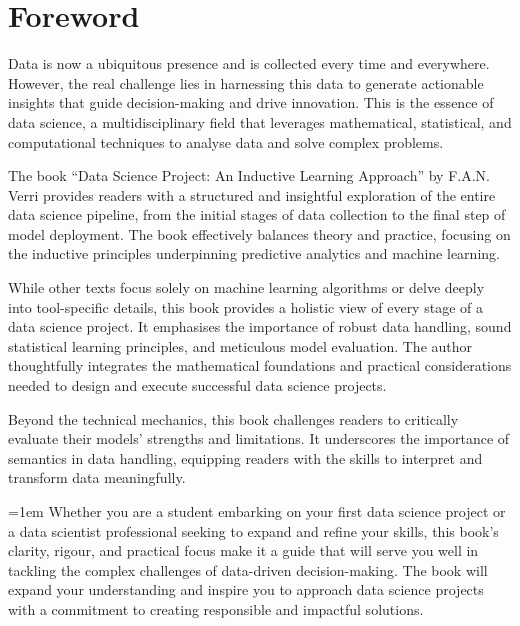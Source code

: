 \chapter{Foreword}


Data is now a ubiquitous presence and is collected every time and everywhere. However, the
real challenge lies in harnessing this data to generate actionable insights that guide
decision-making and drive innovation. This is the essence of data science, a
multidisciplinary field that leverages mathematical, statistical, and computational
techniques to analyse data and solve complex problems.

The book ``Data Science Project: An Inductive Learning Approach'' by F.A.N. Verri provides
readers with a structured and insightful exploration of the entire data science pipeline,
from the initial stages of data collection to the final step of model deployment. The book
effectively balances theory and practice, focusing on the inductive principles
underpinning predictive analytics and machine learning.

While other texts focus solely on machine learning algorithms or delve deeply into
tool-specific details, this book provides a holistic view of every stage of a data science
project. It emphasises the importance of robust data handling, sound statistical learning
principles, and meticulous model evaluation. The author thoughtfully integrates the
mathematical foundations and practical considerations needed to design and execute
successful data science projects.

Beyond the technical mechanics, this book challenges
readers to critically evaluate their models' strengths and limitations. It underscores the
importance of semantics in data handling, equipping readers with the skills to interpret
and transform data meaningfully.

\begin{sloppypar}
\emergencystretch=1em
Whether you are a student embarking on your first data science project or a data scientist
professional seeking to expand and refine your skills, this book's clarity, rigour, and
practical focus make it a guide that will serve you well in tackling the complex
challenges of data-driven decision-making. The book will expand your understanding and
inspire you to approach data science projects with a commitment to creating responsible
and impactful solutions.
\end{sloppypar}
